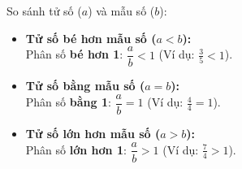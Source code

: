 \documentclass[14pt,a4paper,oneside]{extbook}
\begin{document}
\begin{minipage}[t]{0.49\textwidth}\vspace{0pt}
\begin{tcolorbox}[
  enhanced,
  colback=teal!4!white,
  colframe=teal!75!black,
  arc=2mm, boxrule=0.8pt,
  left=2mm, right=2mm, top=1.8mm, bottom=1.8mm,
  title={\footnotesize\bfseries\color{white}\faBalanceScale\ 2. So sánh phân số với 1}
]
{\footnotesize
So sánh tử số ($a$) và mẫu số ($b$):
\begin{itemize}\setlength{\itemsep}{1.5pt}\setlength{\leftskip}{-2.5mm}
  \item \textbf{Tử số bé hơn mẫu số ($a < b$):}\\
  Phân số \textbf{bé hơn 1}: $\dfrac{a}{b} < 1$ (Ví dụ: $\frac{3}{5} < 1$).
  \item \textbf{Tử số bằng mẫu số ($a = b$):}\\
  Phân số \textbf{bằng 1}: $\dfrac{a}{b} = 1$ (Ví dụ: $\frac{4}{4} = 1$).
  \item \textbf{Tử số lớn hơn mẫu số ($a > b$):}\\
  Phân số \textbf{lớn hơn 1}: $\dfrac{a}{b} > 1$ (Ví dụ: $\frac{7}{4} > 1$).
\end{itemize}
}
\end{tcolorbox}
\end{minipage}
\end{document}

